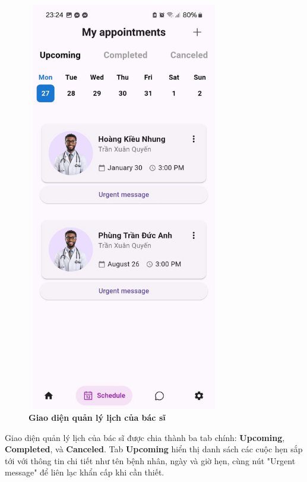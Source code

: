 \begin{figure}[H]
	\centering
	\includegraphics[width=8.5cm,height=18cm]{Images/AppUI/scheduleUpComing.jpg}
	\caption[Giao diện quản lý lịch của bác sĩ]{\bfseries \fontsize{12pt}{0pt}\selectfont Giao diện quản lý lịch của bác sĩ}
	\label{scheduleDoctor}
\end{figure}
Giao diện quản lý lịch của bác sĩ được chia thành ba tab chính: \textbf{Upcoming}, \textbf{Completed}, và \textbf{Canceled}. Tab \textbf{Upcoming} hiển thị danh sách các cuộc hẹn sắp tới với thông tin chi tiết như tên bệnh nhân, ngày và giờ hẹn, cùng nút "Urgent message" để liên lạc khẩn cấp khi cần thiết.

